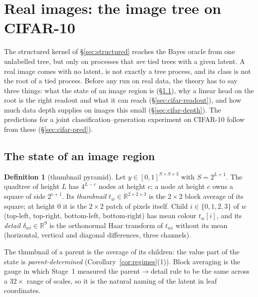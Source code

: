 \documentclass[11pt]{article}
\theoremstyle{definition}
\newtheorem{definition}[theorem]{Definition}
\newcommand{\R}{\mathbb R}
\begin{document}
\section{Real images: the image tree on CIFAR-10}\label{sec:cifar}
The structured kernel of \S\ref{sec:structured} reaches the Bayes oracle from one unlabelled tree, but only
on processes that \emph{are} tied trees with a given latent. A real image comes with no latent, is not
exactly a tree process, and its class is not the root of a tied process. Before any run on real data, the
theory has to say three things: what the state of an image region is (\S\ref{sec:cifar-state}), why a linear
head on the root is the right readout and what it can reach (\S\ref{sec:cifar-readout}), and how much data
depth supplies on images this small (\S\ref{sec:cifar-depth}). The predictions for a joint
classification--generation experiment on CIFAR-10 follow from these (\S\ref{sec:cifar-pred}).

\subsection{The state of an image region}\label{sec:cifar-state}
\begin{definition}[thumbnail pyramid]\label{def:pyramid}
Let $y\in[0,1]^{S\times S\times3}$ with $S=2^{L+1}$. The quadtree of height $L$ has $4^{L-c}$ nodes at
height $c$; a node at height $c$ owns a square of side $2^{c+1}$. Its \emph{thumbnail}
$t_w\in\R^{2\times2\times3}$ is the $2\times2$ block average of its square; at height $0$ it is the
$2\times2$ patch of pixels itself. Child $i\in\{0,1,2,3\}$ of $w$ (top-left, top-right, bottom-left,
bottom-right) has mean colour $t_w[i]$, and its \emph{detail} $\delta_{wi}\in\R^9$ is the orthonormal Haar
transform of $t_{wi}$ without its mean (horizontal, vertical and diagonal differences, three channels).
\end{definition}

\noindent The thumbnail of a parent is the average of its children: the value part of the state is
\emph{parent-determined} (Corollary~\ref{cor:regimes}(1)). Block averaging is the gauge in which Stage~1 measured
the parent$\to$detail rule to be the same across a $32\times$ range of scales, so it is the natural naming of
the latent in leaf coordinates.
\end{document}
